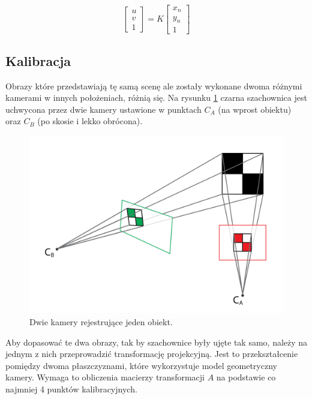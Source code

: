 \begin{equation}
\begin{bmatrix}
u \\
v \\
1
\end{bmatrix} = K \begin{bmatrix}
x_n \\
y_n \\
1
\end{bmatrix}
\end{equation}

\subsection{Kalibracja}
Obrazy które przedstawiają tę samą scenę ale zostały wykonane dwoma różnymi kamerami w innych położeniach, różnią się. Na rysunku \ref{fig:oneSceaneTwoCameras} czarna szachownica jest uchwycona przez dwie kamery ustawione w punktach $C_A$  (na wprost obiektu) oraz $C_B$ (po skosie i lekko obrócona). 

\begin{figure}
\centering
\includegraphics[width=0.6\linewidth]{images/oneSceaneTwoCameras}
\caption[Dwie kamery rejestrujące jeden obiekt. ]{Dwie kamery rejestrujące jeden obiekt.}
\label{fig:oneSceaneTwoCameras}
\end{figure}

Aby dopasować te dwa obrazy, tak by szachownice były ujęte tak samo, należy na jednym z nich przeprowadzić  transformację projekcyjną. Jest to przekształcenie pomiędzy dwoma płaszczyznami, które wykorzystuje model geometryczny kamery. Wymaga to obliczenia macierzy transformacji $A$ na podstawie co najmniej 4 punktów kalibracyjnych. 


